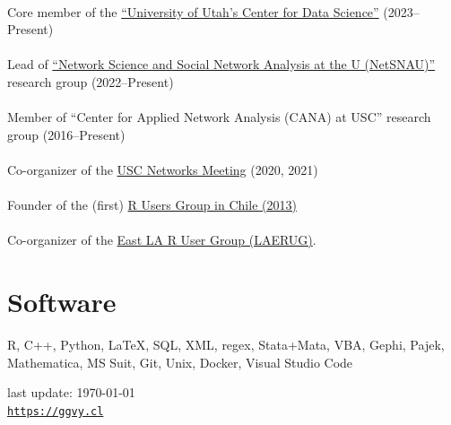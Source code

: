 \documentclass[letterpaper, 10pt]{article}
\def\footerlink{https://ggvy.cl}
\renewcommand{\textbf}[1]{{\bfseries\color{teal}#1}}
\begin{document}
\noindent \textbf{Misc}\\

\noindent Core member of the \href{https://datascience.utah.edu}{``University of Utah's Center for Data Science''} (2023--Present)\\\\
%
Lead of \href{https://netsci.utah.edu}{``Network Science and Social Network Analysis at the U (NetSNAU)''} research group (2022--Present)\\\\
%
Member of ``Center for Applied Network Analysis (CANA) at USC'' research group (2016--Present) \\\\
%
Co-organizer of the \href{https://networkanalysis.usc.edu}{USC Networks Meeting} (2020, 2021)\\\\
%
Founder of the (first) \href{https://www.meetup.com/useRchile/}{R Users Group in Chile (2013)}\\\\
%
Co-organizer of the \href{https://socalr.org}{East LA R User Group (LAERUG)}.

\section*{Software}

R, C++, Python, \LaTeX, SQL, XML, regex, Stata+Mata, VBA, Gephi, Pajek, Mathematica, MS Suit, Git, Unix, Docker, Visual Studio Code

\bigskip

\begin{center}
 \begin{footnotesize}
   last update: \today \\
   \href{\footerlink}{\texttt{\footerlink}}
 \end{footnotesize}
\end{center}
\end{document}
